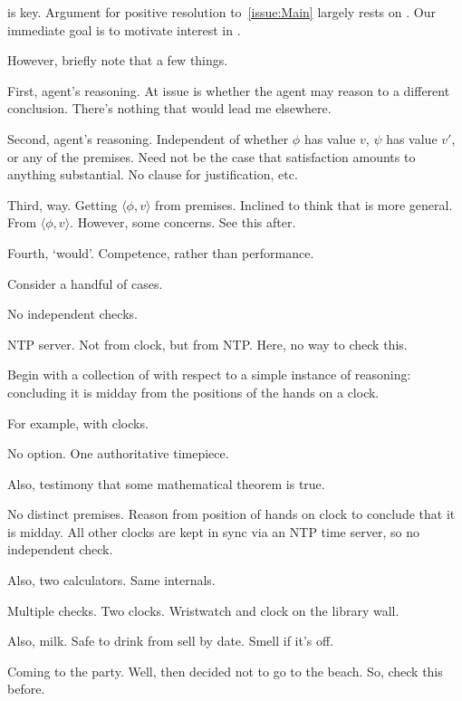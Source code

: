 \begin{note}
  \csN{} is key.
  Argument for positive resolution to~\autoref{issue:Main} largely rests on \csN{}.
  Our immediate goal is to motivate interest in \csN{}.

  However, briefly note that a few things.

  First, agent's reasoning.
  At issue is whether the agent may reason to a different conclusion.
  There's nothing that would lead me elsewhere.

  Second, agent's reasoning.
  Independent of whether \(\phi\) has value \(v\), \(\psi\) has value \(v'\), or any of the premises.
  Need not be the case that satisfaction amounts to anything substantial.
  No clause for justification, etc.

  Third, way.
  Getting \(\langle \phi, v \rangle\) from premises.
  Inclined to think that \csN{} is more general.
  From \(\langle \phi, v \rangle\).
  However, some concerns.
  See this after.

  Fourth, `would'.
  Competence, rather than performance.
\end{note}

\begin{note}
  Consider a handful of cases.
\end{note}

\begin{note}[Trivial]
  No independent checks.
\end{note}

\begin{note}[Pruning]
  NTP server.
  Not from clock, but from NTP.
  Here, no way to check this.
\end{note}

\begin{note}[\illu{3}]
  Begin with a collection of  with respect to a simple instance of reasoning: concluding it is midday from the positions of the hands on a clock.


  For example, with clocks.

  No option.
  One authoritative timepiece.

  Also, testimony that some mathematical theorem is true.

  No distinct premises.
  Reason from position of hands on clock to conclude that it is midday.
  All other clocks are kept in sync via an NTP time server, so no independent check.

  Also, two calculators.
  Same internals.

  Multiple checks.
  Two clocks.
  Wristwatch and clock on the library wall.

  Also, milk.
  Safe to drink from sell by date.
  Smell if it's off.

  Coming to the party.
  Well, then decided not to go to the beach.
  So, check this before.
\end{note}

